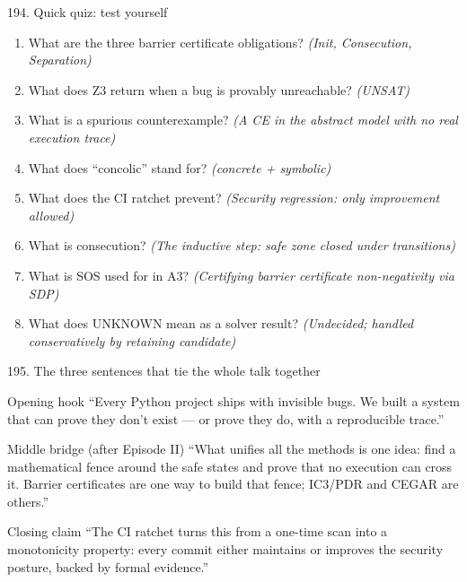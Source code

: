 \documentclass[aspectratio=169]{beamer}
\begin{document}
\begin{frame}{194. Quick quiz: test yourself}
\begin{enumerate}
  \item What are the three barrier certificate obligations? \textit{(Init, Consecution, Separation)}
  \item What does Z3 return when a bug is provably unreachable? \textit{(UNSAT)}
  \item What is a spurious counterexample? \textit{(A CE in the abstract model with no real execution trace)}
  \item What does ``concolic'' stand for? \textit{(concrete + symbolic)}
  \item What does the CI ratchet prevent? \textit{(Security regression: only improvement allowed)}
  \item What is consecution? \textit{(The inductive step: safe zone closed under transitions)}
  \item What is SOS used for in A3? \textit{(Certifying barrier certificate non-negativity via SDP)}
  \item What does UNKNOWN mean as a solver result? \textit{(Undecided; handled conservatively by retaining candidate)}
\end{enumerate}
\end{frame}

\begin{frame}{195. The three sentences that tie the whole talk together}
\begin{block}{Opening hook}
``Every Python project ships with invisible bugs. We built a system that can prove they don't exist
--- or prove they do, with a reproducible trace.''
\end{block}
\begin{block}{Middle bridge (after Episode II)}
``What unifies all the methods is one idea: find a mathematical fence around the safe states and prove that
no execution can cross it. Barrier certificates are one way to build that fence; IC3/PDR and CEGAR are others.''
\end{block}
\begin{block}{Closing claim}
``The CI ratchet turns this from a one-time scan into a monotonicity property: every commit either
maintains or improves the security posture, backed by formal evidence.''
\end{block}
\end{frame}
\end{document}
